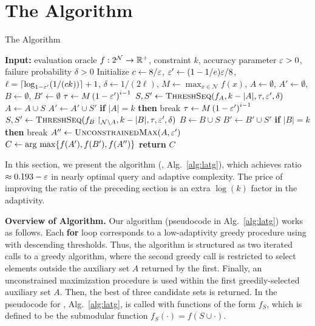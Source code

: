 \section{The \algTwofullname Algorithm} \label{sec:latg}
\begin{algorithm}[t]
  \caption{The \adaptg Algorithm}
  \label{alg:latg}
  \begin{algorithmic}[1]
    \Statex \textbf{Input:} evaluation oracle $f:2^{\mathcal N} \to \mathbb{R}^+$, constraint $k$,
    accuracy parameter $\varepsilon > 0$, failure probability $\delta > 0$
    \State Initialize $c \gets 8 / \varepsilon$, $\varepsilon' \gets (1 - 1/e)\varepsilon / 8 $, 
    $\ell=\lceil \log_{1 -  \varepsilon'}(1/(ck)) \rceil+1$,
    $\delta\gets 1/ (2\ell)$,
    $M \gets \max_{x \in \mathcal N} f(x)$, $A \gets \emptyset$, 
    $A' \gets \emptyset$, $B \gets \emptyset$, $B' \gets \emptyset$
    \label{line:for1}
    \State $\tau \gets M \left( 1 -  \varepsilon' \right)^{i-1}$
    \State $S,S' \gets \textsc{ThreshSeq} (f_A, k - |A|,  \tau,  \varepsilon', \delta)$ \label{line:thresh1}
    \State $A \gets A \cup S$
    \State $A' \gets A' \cup S'$
    \State \textbf{if} $|A|=k$ \textbf{then} break
    \EndFor
    \label{line:for2}
    \State $\tau \gets M \left( 1 -  \varepsilon' \right)^{i-1}$
    \State $S,S' \gets \textsc{ThreshSeq} ( f_B\restriction_{ \mathcal N \setminus A }, k - |B|, \tau,  \varepsilon', \delta)$ \label{line:thresh2}
    \State $B \gets B \cup S$
    \State $B' \gets B' \cup S'$
    \State \textbf{if} $|B|=k$ \textbf{then} break
    \EndFor
    \State $A'' \gets \textsc{UnconstrainedMax} (A,  \varepsilon')$\label{line:unc}
    \State $C \gets \arg\, \max \{ f(A'), f(B'), f(A'') \}$\label{line:chooseC}
    \State \textbf{return} $C$
    \EndProcedure
\end{algorithmic}
\end{algorithm}
In this section, we present the algorithm \algTwofullname 
(\latg, Alg.~\ref{alg:latg}), 
which achieves ratio $\approx 0.193 - \varepsilon$ 
in nearly optimal query and
adaptive complexity. 
The price of improving the ratio of the preceding section 
is an extra $\log(k)$ factor in the adaptivity. 

\textbf{Overview of Algorithm.}
Our algorithm (pseudocode in Alg.~\ref{alg:latg}) works
as follows. Each \textbf{for} loop corresponds to a low-adaptivity
greedy procedure using \threseq with descending thresholds. Thus,
the algorithm is structured as two iterated calls to a greedy algorithm,
where the second greedy call is restricted to select elements outside the
auxiliary set $A$ returned by the first. 
Finally, an unconstrained maximization
procedure is used within the first greedily-selected auxiliary set $A$.
Then, the best
of three candidate sets is returned. 
In the pseudocode for \latg, Alg.~\ref{alg:latg}, \threseq is called with
functions of the form $f_S$, which is defined
to be the submodular function $f_S( \cdot ) = f( S \cup \cdot )$.

